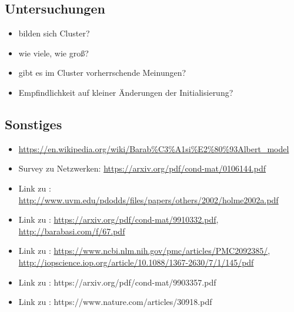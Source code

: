 \documentclass[11pt, a4paper]{scrartcl}
\begin{document}
\subsection{Untersuchungen}
\begin{itemize}
\item bilden sich Cluster?
\item wie viele, wie groß?
\item gibt es im Cluster vorherrschende Meinungen?
\item Empfindlichkeit auf kleiner Änderungen der Initialisierung?
\end{itemize}

\subsection{Sonstiges}
\begin{itemize}
\item \url{https://en.wikipedia.org/wiki/Barab%C3%A1si%E2%80%93Albert_model}
\item Survey zu Netzwerken: \url{https://arxiv.org/pdf/cond-mat/0106144.pdf}
\item Link zu \autocite{Holme2002}: \url{http://www.uvm.edu/pdodds/files/papers/others/2002/holme2002a.pdf}
\item Link zu \autocite{Barabasi509}: \url{https://arxiv.org/pdf/cond-mat/9910332.pdf}, \url{http://barabasi.com/f/67.pdf}
\item Link zu \autocite{Ispolatov2005}: \url{https://www.ncbi.nlm.nih.gov/pmc/articles/PMC2092385/}, \url{http://iopscience.iop.org/article/10.1088/1367-2630/7/1/145/pdf}
\item Link zu \autocite{Newman1999}: https://arxiv.org/pdf/cond-mat/9903357.pdf
\item Link zu \autocite{Watts1998}: https://www.nature.com/articles/30918.pdf
\end{itemize}
\end{document}
